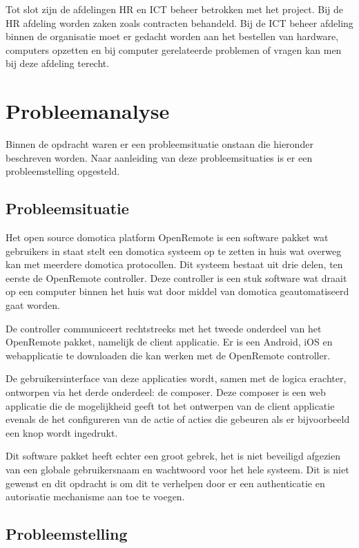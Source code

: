 \documentclass[]{article}
\begin{document}
Tot slot zijn de afdelingen HR en ICT beheer betrokken met het project. Bij
de HR afdeling worden zaken zoals contracten behandeld. Bij de ICT beheer
afdeling binnen de organisatie moet er gedacht worden aan het bestellen van
hardware, computers opzetten en bij computer gerelateerde problemen of
vragen kan men bij deze afdeling terecht.

\newpage
\section{Probleemanalyse}
Binnen de opdracht waren er een probleemsituatie onstaan die hieronder
beschreven worden. Naar aanleiding van deze probleemsituaties is er een
probleemstelling opgesteld.

\subsection{Probleemsituatie}

Het open source domotica platform OpenRemote is een software pakket wat
gebruikers in staat stelt een domotica systeem op te zetten in huis wat
overweg kan met meerdere domotica protocollen. Dit systeem bestaat uit drie
delen, ten eerste de OpenRemote controller. Deze controller is een stuk
software wat draait op een computer binnen het huis wat door middel van
domotica geautomatiseerd gaat worden.

De controller communiceert rechtstreeks met het tweede onderdeel van het
OpenRemote pakket, namelijk de client applicatie. Er is een Android, iOS en
webapplicatie te downloaden die kan werken met de OpenRemote controller.

De gebruikersinterface van deze applicaties wordt, samen met de logica
erachter, ontworpen via het derde onderdeel: de composer. Deze composer is
een web applicatie die de mogelijkheid geeft tot het ontwerpen van de
client applicatie evenals de het configureren van de actie of acties die
gebeuren als er bijvoorbeeld een knop wordt ingedrukt.

Dit software pakket heeft echter een groot gebrek, het is niet beveiligd
afgezien van een globale gebruikersnaam en wachtwoord voor het hele
systeem. Dit is niet gewenst en dit opdracht is om dit te verhelpen door
er een authenticatie en autorisatie mechanisme aan toe te voegen.

\subsection{Probleemstelling}
\end{document}
